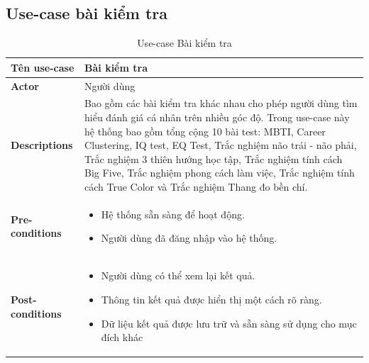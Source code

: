 \subsection{Use-case bài kiểm tra}
    \begin{longtable}[H]{|l|p{}|}
        \caption{Use-case Bài kiểm tra}
        \\ \hline
        \textbf{Tên use-case} & Bài kiểm tra \\
        \hline
        \textbf{Actor} & Người dùng \\
        \hline
        \textbf{Descriptions} & Bao gồm các bài kiểm tra khác nhau cho phép người dùng tìm hiểu đánh giá cá nhân trên nhiều góc độ. Trong use-case này hệ thống bao gồm tổng cộng 10 bài test: MBTI, Career Clustering, IQ test, EQ Test, Trắc nghiệm não trái - não phải, Trắc nghiệm 3 thiên hướng học tập, Trắc nghiệm tính cách Big Five, Trắc nghiệm phong cách làm việc, Trắc nghiệm tính cách True Color và Trắc nghiệm Thang đo bền chí.\\
        \hline
        \textbf{Pre-conditions} & \vspace{-0.75cm} \begin{itemize}[leftmargin=4mm]
            \setlength\itemsep{0em}
            \item Hệ thống sẵn sàng để hoạt động.
            \item Người dùng đã đăng nhập vào hệ thống.
        \end{itemize} \\
        
        \hline

        \textbf{Post-conditions} & \vspace{-0.75cm} \begin{itemize}[leftmargin=4mm]
            \setlength\itemsep{0em}
            \item Người dùng có thể xem lại kết quả.
            \item Thông tin kết quả được hiển thị một cách rõ ràng.
            \item Dữ liệu kết quả được lưu trữ và sẵn sàng sử dụng cho mục đích khác
        \end{itemize} \\
        
        \hline
        

\end{longtable}
